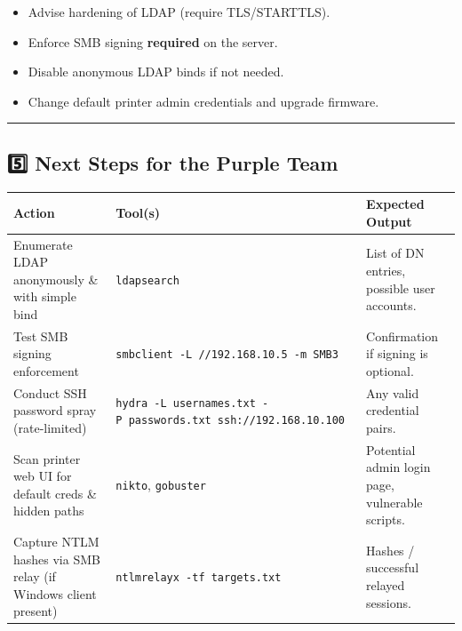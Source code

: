 \begin{enumerate}
    \begin{itemize}
        \tightlist
        \item
        Advise hardening of LDAP (require TLS/STARTTLS).
        \item
        Enforce SMB signing \textbf{required} on the server.
        \item
        Disable anonymous LDAP binds if not needed.
        \item
        Change default printer admin credentials and upgrade firmware.
    \end{itemize}
\end{enumerate}

\begin{center}
            \rule{0.5\linewidth}{0.5pt}
\end{center}

\subsection{5️⃣ Next Steps for the Purple
Team}\label{next-steps-for-the-purple-team}

\begin{longtable}[]{@{}
        >{\raggedright\arraybackslash}p{}
        >{\raggedright\arraybackslash}p{}
        >{\raggedright\arraybackslash}p{}@{}}
    \toprule\noalign{}
    \begin{minipage}[b]{\linewidth}
                \raggedright
            Action
    \end{minipage} & \begin{minipage}[b]{\linewidth}
                                 \raggedright
                             Tool(s)
    \end{minipage} & \begin{minipage}[b]{\linewidth}
                                 \raggedright
                             Expected Output
    \end{minipage} \\
    \midrule\noalign{}
    \endhead
    \bottomrule\noalign{}
    \endlastfoot
    Enumerate LDAP anonymously \& with simple bind & \texttt{ldapsearch} &
    List of DN entries, possible user accounts. \\
    Test SMB signing enforcement &
    \texttt{smbclient\ -L\ //192.168.10.5\ -m\ SMB3} & Confirmation if
    signing is optional. \\
    Conduct SSH password spray (rate‑limited) &
    \texttt{hydra\ -L\ usernames.txt\ -P\ passwords.txt\ ssh://192.168.10.100}
    & Any valid credential pairs. \\
    Scan printer web UI for default creds \& hidden paths & \texttt{nikto},
    \texttt{gobuster} & Potential admin login page, vulnerable scripts. \\
    Capture NTLM hashes via SMB relay (if Windows client present) &
    \texttt{ntlmrelayx\ -tf\ targets.txt} & Hashes / successful relayed
    sessions. \\
\end{longtable}

